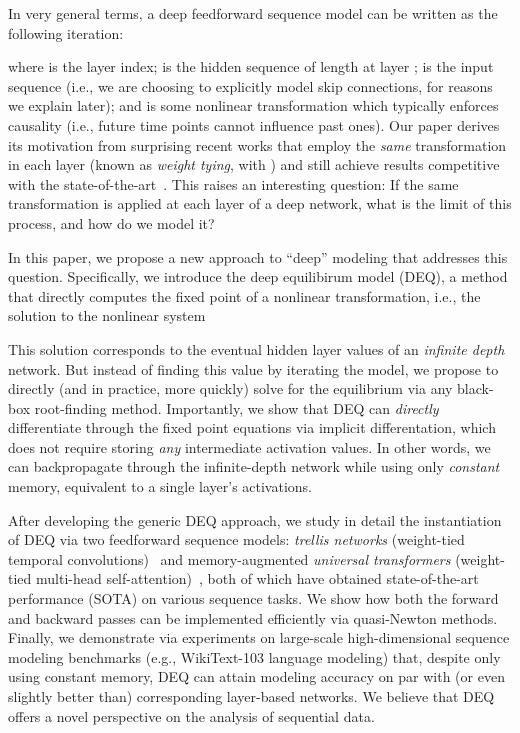 \documentclass{article}
\begin{document}
In very general terms, a deep feedforward sequence model can be written as the following iteration:

where  is the layer index;  is the hidden sequence of length  at layer ;  is the input sequence (i.e., we are choosing to explicitly model skip connections, for reasons we explain later); and  is some nonlinear transformation which typically enforces causality (i.e., future time points cannot influence past ones).  Our paper derives its motivation from surprising recent works that employ the \emph{same} transformation in each layer (known as \emph{weight tying}, with ) and still achieve results competitive with the state-of-the-art~\cite{dehghani2018universal,bai2018trellis,dabre2019recurrent}. This raises an interesting question: If the same transformation is applied at each layer of a deep network, what is the limit of this process, and how do we model it?

In this paper, we propose a new approach to ``deep'' modeling that addresses this question.  Specifically, we introduce the deep equilibirum model (DEQ), a method that directly computes the fixed point  of a nonlinear transformation, i.e., the solution to the nonlinear system

This solution corresponds to the eventual hidden layer values of an \emph{infinite depth} network.  But instead of finding this value by iterating the model, we propose to directly (and in practice, more quickly) solve for the equilibrium via any black-box root-finding method.  Importantly, we show that DEQ can \emph{directly} differentiate through the fixed point equations via implicit differentation, which does not require storing \emph{any} intermediate activation values.  In other words, we can backpropagate through the infinite-depth network while using only \emph{constant} memory, equivalent to a single layer's activations.

After developing the generic DEQ approach, we study in detail the instantiation of DEQ via two feedforward sequence models: \emph{trellis networks} (weight-tied temporal convolutions)~\citep{bai2018trellis} and memory-augmented \emph{universal transformers} (weight-tied multi-head self-attention)~\citep{dehghani2018universal,dai2018transformer}, both of which have obtained state-of-the-art performance (SOTA) on various sequence tasks. We show how both the forward and backward passes can be implemented efficiently via quasi-Newton methods. Finally, we demonstrate via experiments on large-scale high-dimensional sequence modeling benchmarks (e.g., WikiText-103 language modeling) that, despite only using constant memory, DEQ can attain modeling accuracy on par with (or even slightly better than) corresponding layer-based networks. We believe that DEQ offers a novel perspective on the analysis of sequential data.
\end{document}
